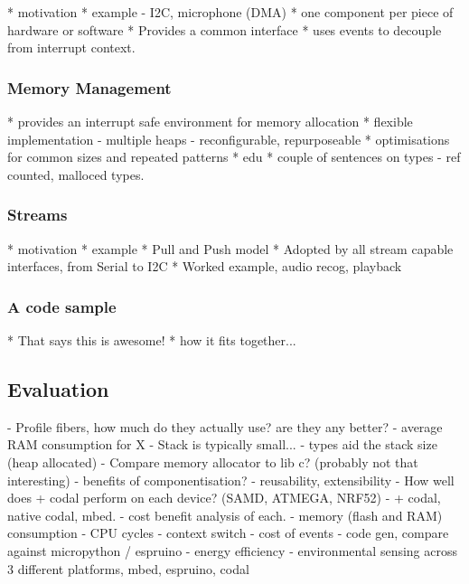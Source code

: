 * motivation
* example - I2C, microphone (DMA)
* one component per piece of hardware or software
* Provides a common interface
* uses events to decouple from interrupt context.

\subsubsection{Memory Management}

* provides an interrupt safe environment for memory allocation
* flexible implementation
    - multiple heaps
    - reconfigurable, repurposeable
* optimisations for common sizes and repeated patterns
* edu
* couple of sentences on types
    - ref counted, malloced types.

\subsubsection{Streams}

* motivation
* example
* Pull and Push model
* Adopted by all stream capable interfaces, from Serial to I2C
* Worked example, audio recog, playback

\subsubsection{A code sample}

* That says this is awesome!
* how it fits together...

\subsection{Evaluation}

- Profile fibers, how much do they actually use? are they any better?
    - average RAM consumption for X
    - Stack is typically small...
    - types aid the stack size (heap allocated)
- Compare memory allocator to lib c? (probably not that interesting)
- benefits of componentisation?
    - reusability, extensibility
- How well does \MC + codal perform on each device? (SAMD, ATMEGA, NRF52)
    - \MC + codal, native codal, mbed.
    - cost benefit analysis of each.
    - memory (flash and RAM) consumption
    - CPU cycles
        - context switch
        - cost of events
        - code gen, compare against micropython / espruino
    - energy efficiency
        - environmental sensing across 3 different platforms, mbed, espruino, codal